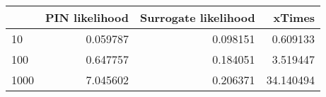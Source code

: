 \begin{tabular}{lrrr}
\toprule
{} &  PIN likelihood &  Surrogate likelihood &     xTimes \\
\midrule
10   &        0.059787 &              0.098151 &   0.609133 \\
100  &        0.647757 &              0.184051 &   3.519447 \\
1000 &        7.045602 &              0.206371 &  34.140494 \\
\bottomrule
\end{tabular}
